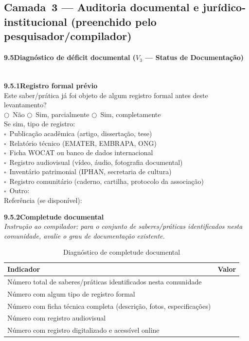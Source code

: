\subsection{Camada~3 --- Auditoria documental e jurídico-institucional (preenchido pelo pesquisador/compilador)}

\paragraph{9.5\quad Diagnóstico de déficit documental ($V_3$ --- Status de Documentação)}~\\[4pt]

\noindent\textbf{9.5.1\quad Registro formal prévio}\\[2pt]
Este saber/prática já foi objeto de algum registro formal antes deste levantamento?\\
$\bigcirc$~Não \quad $\bigcirc$~Sim, parcialmente \quad $\bigcirc$~Sim, completamente\\[2pt]
Se sim, tipo de registro:\\
$\square$~Publicação acadêmica (artigo, dissertação, tese)\\
$\square$~Relatório técnico (EMATER, EMBRAPA, ONG)\\
$\square$~Ficha WOCAT ou banco de dados internacional\\
$\square$~Registro audiovisual (vídeo, áudio, fotografia documental)\\
$\square$~Inventário patrimonial (IPHAN, secretaria de cultura)\\
$\square$~Registro comunitário (caderno, cartilha, protocolo da associação)\\
$\square$~Outro: \dotfill\\[2pt]
Referência (se disponível): \dotfill

\medskip\noindent\textbf{9.5.2\quad Completude documental}\\[2pt]
\textit{Instrução ao compilador: para o conjunto de saberes/práticas identificados nesta comunidade, avalie o grau de documentação existente.}

\begin{table}[htbp]
\centering\small
\caption{Diagnóstico de completude documental}
\label{tab:app_completude}
\begin{tabular}{p{9cm}c}
\toprule
\textbf{Indicador} & \textbf{Valor} \\
\midrule
Número total de saberes/práticas identificados nesta comunidade & \\
Número com algum tipo de registro formal & \\
Número com ficha técnica completa (descrição, fotos, especificações) & \\
Número com registro audiovisual & \\
Número com registro digitalizado e acessível online & \\
\bottomrule
\end{tabular}
\end{table}

